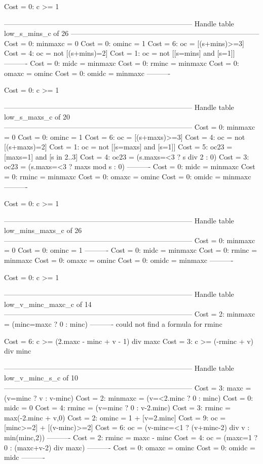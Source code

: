 Cost =  0:  c >= 1

--------------------------------------------------------------------------------
Handle table low_s_mins_c of 26
--------------------------------------------------------------------------------
Cost =  0:  minmaxc = 0
Cost =  0:  ominc   = 1
Cost =  6:  oc      = [(s+mins)>=3]
Cost =  4:  oc      = not [(s+mins)=2]
Cost =  1:  oc      = not [[s=mins] and [s=1]]
----------
Cost =  0:  midc    = minmaxc
Cost =  0:  rminc   = minmaxc
Cost =  0:  omaxc   = ominc
Cost =  0:  omidc   = minmaxc
----------

Cost =  0:  c >= 1

--------------------------------------------------------------------------------
Handle table low_s_maxs_c of 20
--------------------------------------------------------------------------------
Cost =  0:  minmaxc = 0
Cost =  0:  ominc   = 1
Cost =  6:  oc      = [(s+maxs)>=3]
Cost =  4:  oc      = not [(s+maxs)=2]
Cost =  1:  oc      = not [[s=maxs] and [s=1]]
Cost =  5:  oc23    = [maxs=1] and [s in 2..3]
Cost =  4:  oc23    = (s.maxs=<3 ? s div 2 : 0)
Cost =  3:  oc23    = (s.maxs=<3 ? maxs mod s : 0)
----------
Cost =  0:  midc    = minmaxc
Cost =  0:  rminc   = minmaxc
Cost =  0:  omaxc   = ominc
Cost =  0:  omidc   = minmaxc
----------

Cost =  0:  c >= 1

--------------------------------------------------------------------------------
Handle table low_mins_maxs_c of 26
--------------------------------------------------------------------------------
Cost =  0:  minmaxc = 0
Cost =  0:  ominc   = 1
----------
Cost =  0:  midc    = minmaxc
Cost =  0:  rminc   = minmaxc
Cost =  0:  omaxc   = ominc
Cost =  0:  omidc   = minmaxc
----------

Cost =  0:  c >= 1

--------------------------------------------------------------------------------
Handle table low_v_minc_maxc_c of 14
--------------------------------------------------------------------------------
Cost =  2:  minmaxc = (minc=maxc ? 0 : minc)
----------
could not find a formula for rminc

Cost =  6:  c >= (2.maxc - minc + v - 1) div maxc
Cost =  3:  c >= (-rminc + v) div minc

--------------------------------------------------------------------------------
Handle table low_v_minc_s_c of 10
--------------------------------------------------------------------------------
Cost =  3:  maxc    = (v=minc ? v : v-minc)
Cost =  2:  minmaxc = (v=<2.minc ? 0 : minc)
Cost =  0:  midc    = 0
Cost =  4:  rminc   = (v=minc ? 0 : v-2.minc)
Cost =  3:  rminc   = max(-2.minc + v,0)
Cost =  2:  ominc   = 1 + [v=2.minc]
Cost =  9:  oc      = [minc>=2] + [(v-minc)>=2]
Cost =  6:  oc      = (v-minc=<1 ? (v+minc-2) div v : min(minc,2))
----------
Cost =  2:  rminc   = maxc - minc
Cost =  4:  oc      = (maxc=1 ? 0 : (maxc+v-2) div maxc)
----------
Cost =  0:  omaxc   = ominc
Cost =  0:  omidc   = midc
----------


